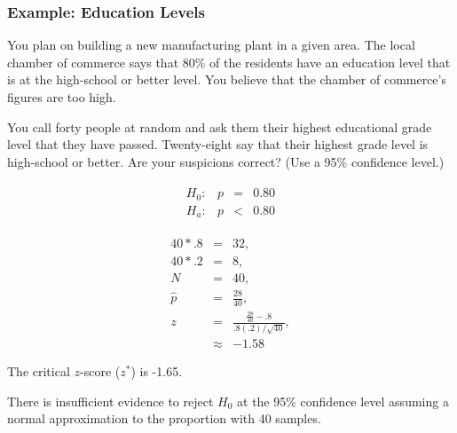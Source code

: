 \begin{frame}
  \frametitle{Example: Education Levels}

  \vspace*{-2em}
  You plan on building a new manufacturing plant in a given area. The
  local chamber of commerce says that 80\% of the residents have an
  education level that is at the high-school or better level. You
  believe that the chamber of commerce's figures are too high.

  You call forty people at random and ask them their highest
  educational grade level that they have passed. Twenty-eight say that
  their highest grade level is high-school or better. Are your
  suspicions correct? (Use a 95\% confidence level.)

  {
    \begin{eqnarray*}
      \begin{array}{lrcl}
        H_0: & p & = & 0.80 \\
        H_a: & p & < & 0.80
      \end{array}
    \end{eqnarray*}
  }

  {
    \begin{eqnarray*}
      40*.8 & = & 32, \\
      40*.2 & = & 8, \\
      N & = & 40, \\
      \hat{p} & = & \frac{28}{40}, \\
      z & = & \frac{\frac{28}{40}-.8}{.8(.2)/\sqrt{40}}, \\
      & \approx & -1.58
    \end{eqnarray*}
  }
  

  {
    The critical $z$-score ($z^*$) is -1.65.
  }

  {

    {\color{red}
      There is insufficient evidence to reject $H_0$ at the 95\%
      confidence level assuming a normal approximation to the
      proportion with 40 samples.
    }

  }


  
\end{frame}


